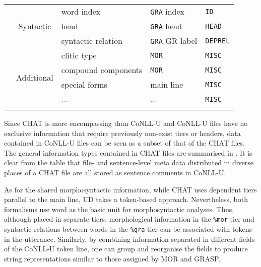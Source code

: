 \begin{table}[h!]
\begin{tabularx}{\widefigurewidth}{@{}lcXll@{}}
\multicolumn{1}{l}{\multirow{11}{*}{}}&\multicolumn{1}{c}{\multirow{3}{*}{Syntactic}}& word index      & \texttt{GRA} index& \texttt{ID}\\
\multicolumn{1}{l}{\multirow{11}{*}{}}&\multicolumn{1}{c}{\multirow{3}{*}{}}& head            & \texttt{GRA} head& \texttt{HEAD}\\
\multicolumn{1}{l}{\multirow{11}{*}{}}&\multicolumn{1}{c}{\multirow{3}{*}{}}& syntactic relation  & \texttt{GRA} GR label& \texttt{DEPREL}\\\addlinespace
\multicolumn{1}{l}{\multirow{11}{*}{}}&\multicolumn{1}{c}{\multirow{4}{*}{Additional}}& clitic type      & \texttt{MOR} & \texttt{MISC}\\
\multicolumn{1}{l}{\multirow{11}{*}{}}&\multicolumn{1}{c}{\multirow{4}{*}{}}& compound components  & \texttt{MOR} & \texttt{MISC}\\
\multicolumn{1}{l}{\multirow{11}{*}{}}&\multicolumn{1}{c}{\multirow{4}{*}{}}& special forms     & main line & \texttt{MISC}\\
\multicolumn{1}{l}{\multirow{11}{*}{}}&\multicolumn{1}{c}{\multirow{4}{*}{}}& ...              & ... & \texttt{MISC}\\\addlinespace
\bottomrule
\end{tabularx}
\end{table}

Since CHAT is more encompassing than CoNLL-U and CoNLL-U files have no exclusive information that require previously non-exist tiers or headers, data contained in CoNLL-U files can be seen as a subset of that of the CHAT files. The general information types contained in CHAT files are summarised in . It is clear from the table that file- and sentence-level meta data distributed in diverse places of a CHAT file are all stored as sentence comments in CoNLL-U.

As for the shared morphosyntactic information, while CHAT uses dependent tiers parallel to the main line, UD takes a token-based approach. Nevertheless, both formalisms use word as the basic unit for morphosyntactic analyses. Thus, although placed in separate tiers, morphological information in the \texttt{\%mor} tier and syntactic relations between words in the \texttt{\%gra} tier can be associated with tokens in the utterance. Similarly, by combining information separated in different fields of the CoNLL-U token line, one can group and reorganise the fields to produce string representations similar to those assigned by MOR and GRASP.
